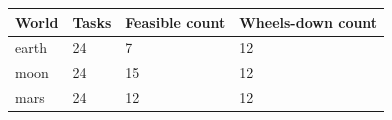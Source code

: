 \begin{tabular}{llll}\toprule
World & Tasks & Feasible count & Wheels-down count\\ \midrule
earth & 24 & 7 & 12\\
moon & 24 & 15 & 12\\
mars & 24 & 12 & 12\\
\bottomrule\end{tabular}
